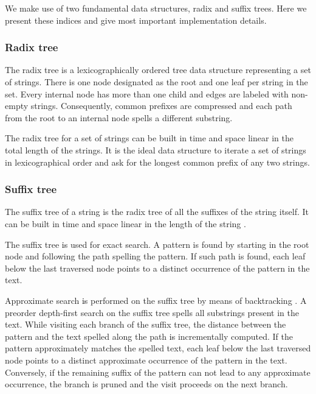 \documentclass[a4,center,fleqn]{article}
\begin{document}
We make use of two fundamental data structures, radix and suffix trees.
Here we present these indices and give most important implementation details.

\subsubsection{Radix tree}

The radix tree \cite{Morrison1968} is a lexicographically ordered tree data structure representing a set of strings.
There is one node designated as the root and one leaf per string in the set.
Every internal node has more than one child and edges are labeled with non-empty strings.
Consequently, common prefixes are compressed and each path from the root to an internal node spells a different substring.

The radix tree for a set of strings can be built in time and space linear in the total length of the strings.
It is the ideal data structure to iterate a set of strings in lexicographical order and ask for the longest common prefix of any two strings.

\subsubsection{Suffix tree}

The suffix tree \cite{Weiner1973} of a string is the radix tree of all the suffixes of the string itself.
It can be built in time and space linear in the length of the string \cite{Ukkonen1995}.

The suffix tree \textcolor{black}{is} used for exact search.
A pattern is found by starting in the root node and following the path spelling the pattern.
If such path is found, each leaf below the last traversed node points to a distinct occurrence of the pattern in the text.

Approximate search \textcolor{black}{is} performed on the suffix tree by means of backtracking \cite{Ukkonen1993, Baeza1999}.
A preorder depth-first search on the suffix tree spells all substrings present in the text.
While visiting each branch of the suffix tree, the distance between the pattern and the text spelled along the path \textcolor{black}{is} incrementally computed.
If the pattern approximately matches the spelled text, each leaf below the last traversed node points to a distinct approximate occurrence of the pattern in the text.
Conversely, if the remaining suffix of the pattern can not lead to any approximate occurrence, the branch is pruned and the visit proceeds on the next branch.
\end{document}
